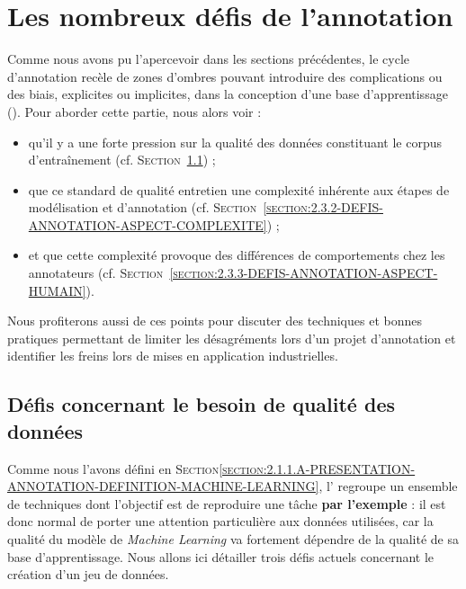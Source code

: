 \section{Les nombreux défis de l'annotation}
\label{section:2.3-DEFIS-ANNOTATION}

	
	Comme nous avons pu l'apercevoir dans les sections précédentes, le cycle d'annotation recèle de zones d'ombres pouvant introduire des complications ou des biais, explicites ou implicites, dans la conception d'une base d'apprentissage (\cite{baledent:2022:complexite-annotation-manuelle}).
	Pour aborder cette partie, nous alors voir :
	\begin{itemize}
		\item qu'il y a une forte pression sur la qualité des données constituant le corpus d'entraînement (cf. \textsc{Section~\ref{section:2.3.1-DEFIS-ANNOTATION-ASPECT-DONNEES}}) ;
		\item que ce standard de qualité entretien une complexité inhérente aux étapes de modélisation et d'annotation (cf. \textsc{Section~\ref{section:2.3.2-DEFIS-ANNOTATION-ASPECT-COMPLEXITE}}) ;
		\item et que cette complexité provoque des différences de comportements chez les annotateurs (cf. \textsc{Section~\ref{section:2.3.3-DEFIS-ANNOTATION-ASPECT-HUMAIN}}).
	\end{itemize}
	Nous profiterons aussi de ces points pour discuter des techniques et bonnes pratiques permettant de limiter les désagréments lors d'un projet d'annotation et identifier les freins lors de mises en application industrielles.
	
	
	\subsection{Défis concernant le besoin de qualité des données}
	\label{section:2.3.1-DEFIS-ANNOTATION-ASPECT-DONNEES}
	
		Comme nous l'avons défini en \textsc{Section\ref{section:2.1.1.A-PRESENTATION-ANNOTATION-DEFINITION-MACHINE-LEARNING}}, l' regroupe un ensemble de techniques dont l'objectif est de reproduire une tâche \textbf{par l'exemple} : il est donc normal de porter une attention particulière aux données utilisées, car la qualité du modèle de \textit{Machine Learning} va fortement dépendre de la qualité de sa base d'apprentissage.
		Nous allons ici détailler trois défis actuels concernant le création d'un jeu de données.
		
